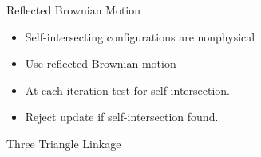 \documentclass{beamer}
\begin{document}
\begin{frame}{Reflected Brownian Motion}
\begin{itemize}
\item Self-intersecting configurations are nonphysical
\item Use reflected Brownian motion
\item At each iteration test for self-intersection.
\item Reject update if self-intersection found.
\end{itemize}
\end{frame}
\begin{frame}{Three Triangle Linkage}
  \centering
\end{frame}

\end{document}
